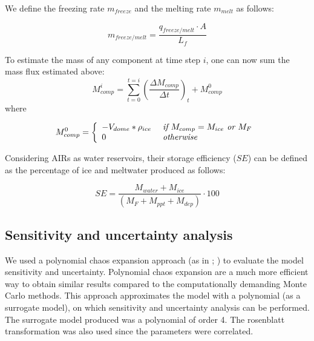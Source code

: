 \documentclass[utf8]{frontiersSCNS} %
\begin{document}
We define the freezing rate $m_{freeze}$ and the melting rate $m_{melt}$ as follows:

\begin{equation}
	m_{freeze/melt} = \frac{q_{freeze/melt} \cdot A }{L_f}
	\label{eq:m_freeze/melt}
\end{equation}

To estimate the mass of any component at time step $i$, one can now sum the mass flux estimated above: \begin{equation}
	M_{comp}^i = \sum_{t=0}^{t=i} (\frac{\Delta M_{comp}}{\Delta t})_{t} + M_{comp}^0 \end{equation} where

\begin{equation} M_{comp}^0 = \left\{ \begin{array}{ll} -V_{dome} * \rho_{ice} & \textit{ if } M_{comp}=
             M_{ice}\textit{ or }
             M_{F}                                                 \\ 0 & \textit{ otherwise }\\\end{array} \right. \\
\end{equation}

Considering AIRs as water reservoirs, their storage efficiency ($SE$) can be defined as the percentage of ice and
meltwater produced as follows:

\begin{equation} \textit{SE} = \frac{M_{water}+M_{ice}}{(M_F+M_{ppt}+M_{dep})} \cdot 100 \end{equation}

\subsection{Sensitivity and uncertainty analysis}

We used a polynomial chaos expansion approach (as in \cite{uncertainpy_2018}; \cite{Xiu_2005}) to evaluate the
model sensitivity and uncertainty. Polynomial chaos expansion are a much more efficient way to obtain similar
results compared to the computationally demanding Monte Carlo methods. This approach approximates the model with a
polynomial (as a surrogate model), on which sensitivity and uncertainty analysis can be performed.  The surrogate
model produced was a polynomial of order 4. The rosenblatt transformation was also used since the parameters were
correlated.
\end{document}
